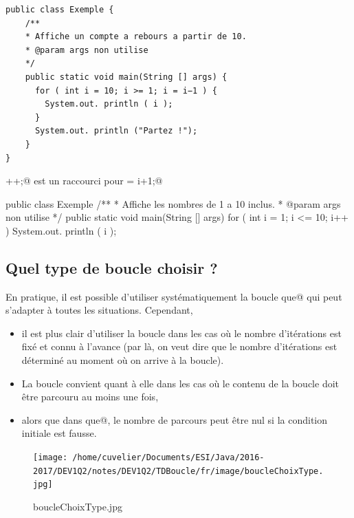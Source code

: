 \documentclass[11pt,a4paper]{article}
\begin{document}
            \par
        \begin{verbatim}
public class Exemple {
    /**
    * Affiche un compte a rebours a partir de 10.
    * @param args non utilise
    */
    public static void main(String [] args) {
      for ( int i = 10; i >= 1; i = i−1 ) {
        System.out. println ( i );
      }
      System.out. println ("Partez !");
    }
}\end{verbatim}\verb@i++;@ est un raccourci pour \verb@i = i+1;@
            \par
        \begin{Java}
public class Exemple {
    /**
    * Affiche les nombres de 1 a 10 inclus.
    * @param args non utilise
    */
    public static void main(String [] args) {
      for ( int i = 1; i <= 10; i++ ) {
        System.out. println ( i );
      }
    }
}\end{Java}\subsection{Quel type de boucle choisir ?}
		    En pratique, il est possible d'utiliser syst\'ematiquement la boucle 
		    \verb@tant que@ qui peut s'adapter
        \`a toutes les situations. Cependant, 
        
					\begin{itemize}
				
			\item 
              il est plus clair d'utiliser la boucle \verb@pour@ 
              dans les cas o\`u le nombre d'it\'erations est fix\'e et connu \`a l'avance
              (par l\`a, on veut dire que le nombre d'it\'erations est d\'etermin\'e au moment o\`u on arrive \`a la boucle). 
            
			\item 
              La boucle \verb@faire@ convient quant \`a elle dans les cas o\`u le contenu de la boucle doit \^etre parcouru au moins une fois,
            
			\item 
              alors que dans \verb@tant que@, le nombre de parcours peut \^etre nul si la condition initiale est fausse.
            
					\end{itemize}
				
            \par
        \begin{figure}[hbt]
				    \begin{center}
					\texttt{[image: /home/cuvelier/Documents/ESI/Java/2016-2017/DEV1Q2/notes/DEV1Q2/TDBoucle/fr/image/boucleChoixType.jpg]}
						\end{center}
                
                    \caption[boucleChoixType.jpg]{boucleChoixType.jpg}
                \end{figure}
                    
\end{document}
